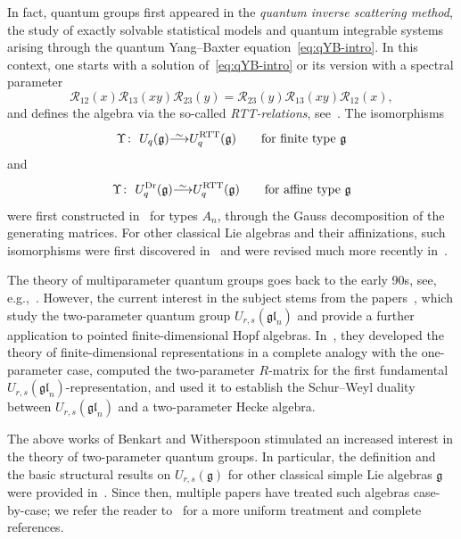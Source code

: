 \documentclass[pdftex]{sigma}
\numberwithin{equation}{section}
\newcommand{\fg}{\mathfrak{g}}
\newcommand{\gl}{\mathfrak{gl}}
\newcommand{\uu}{U_{r,s}(\fg)}
\newcommand\iso{ \vphantom{j^{X^2}}\smash{\overset{\sim}{\vphantom{\rule{0pt}{0.20em}}\smash{\longrightarrow}}} }
\begin{document}
In fact, quantum groups first appeared in the \emph{quantum inverse scattering method}, the study of exactly solvable statistical models and quantum integrable systems arising through the quantum Yang--Baxter equation~\eqref{eq:qYB-intro}. In this context, one starts with a solution of~\eqref{eq:qYB-intro} or its version with a spectral parameter
\begin{equation}\label{eq:qYB-affine-intro}
 \mathcal{R}_{12}(x)\mathcal{R}_{13}(xy)\mathcal{R}_{23}(y)=
 \mathcal{R}_{23}(y)\mathcal{R}_{13}(xy)\mathcal{R}_{12}(x),
\end{equation}
and defines the algebra \smash{$U^{\mathrm{RTT}}_q(\fg)$} via the so-called \emph{RTT-relations}, see~\cite{FRT}. The isomorphisms
\begin{equation}\label{eq:RTT-to-DJ-intro}
 \Upsilon\colon\ U_q(\fg) \iso U^{\mathrm{RTT}}_q(\fg)
 \qquad \text{for finite type}\ \fg
\end{equation}
and
\begin{equation}\label{eq:RTT-to-Dr-intro}
 \Upsilon\colon\ U^{\mathrm{Dr}}_q(\fg) \iso U^{\mathrm{RTT}}_q(\fg)
 \qquad \mathrm{for\ affine\ type}\ \fg
\end{equation}
were first constructed in~\cite{DF} for types $A_n$,  through the Gauss decomposition of the generating matrices. For other classical Lie algebras and their affinizations, such isomorphisms were first discovered in~\cite{HM} and were revised much more recently in~\cite{JLM2, JLM1}.

The theory of multiparameter quantum groups goes back to the early 90s, see, e.g.,~\mbox{\cite{AST,R,T}}. However, the current interest in the subject stems from the papers~\cite{BW2, BW3, BW1},
which study the two-parameter quantum group $U_{r,s}(\gl_n)$ and provide a further application to pointed finite-dimensional Hopf algebras. In~\cite{BW2}, they developed the theory of finite-dimensional representations in a complete analogy with the one-parameter case, computed the two-parameter $R$-matrix for the first fundamental $U_{r,s}(\gl_n)$-representation, and used it to establish the Schur--Weyl duality between $U_{r,s}(\gl_n)$ and a two-parameter Hecke algebra.

The above works of Benkart and Witherspoon stimulated an increased interest in the theory of two-parameter quantum groups. In particular, the definition and the basic structural results on $\uu$ for other classical simple Lie algebras $\fg$ were provided in~\cite{BGH1,BGH2}. Since then, multiple papers have treated such algebras case-by-case; we refer the reader to~\cite{HP} for a more uniform treatment and complete references.
\end{document}
